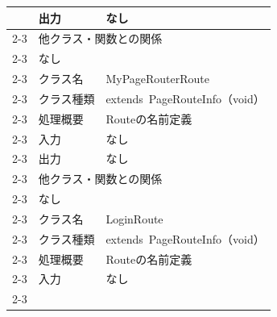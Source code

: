\begin{longtable}{|c|l|l|}
                            & 出力                                                & なし                                            \\ \cline{2-3}
                            & \multicolumn{2}{l|}{他クラス・関数との関係}                                                                  \\ \cline{2-3}
                            & \multicolumn{2}{p{14cm}|}{なし}                                                                     \\ \cline{2-3}
                            & クラス名                                              & MyPageRouterRoute                             \\ \cline{2-3}
                            & クラス種類                                             & extends\ PageRouteInfo（void）                  \\ \cline{2-3}
                            & 処理概要                                              & \multicolumn{1}{p{12cm}|}{Routeの名前定義}         \\ \cline{2-3}
                            & 入力                                                & なし                                            \\ \cline{2-3}
                            & 出力                                                & なし                                            \\ \cline{2-3}
                            & \multicolumn{2}{l|}{他クラス・関数との関係}                                                                  \\ \cline{2-3}
                            & \multicolumn{2}{p{14cm}|}{なし}                                                                     \\ \cline{2-3}
                            & クラス名                                              & LoginRoute                                    \\ \cline{2-3}
                            & クラス種類                                             & extends\ PageRouteInfo（void）                  \\ \cline{2-3}
                            & 処理概要                                              & \multicolumn{1}{p{12cm}|}{Routeの名前定義}         \\ \cline{2-3}
                            & 入力                                                & なし                                            \\ \cline{2-3}

\end{longtable}
